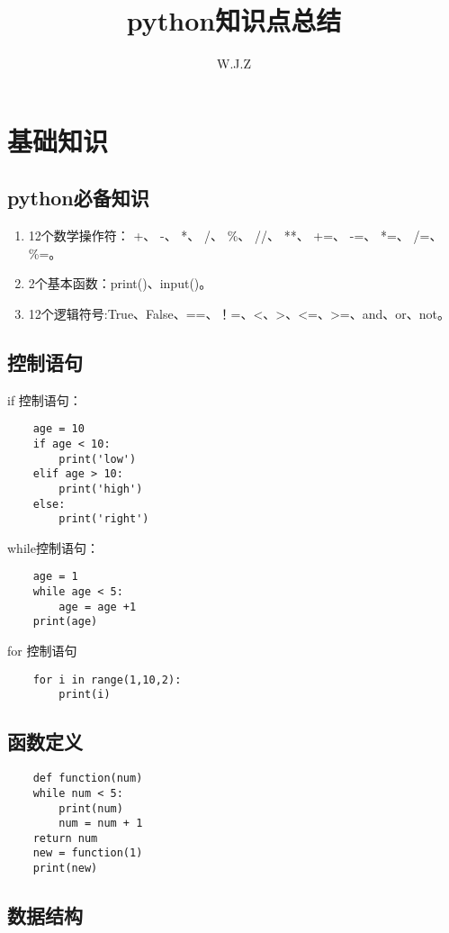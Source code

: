 \documentclass[twocolumn]{article}
\title{python知识点总结}
\author{W.J.Z}
\date{}
\begin{document}
	\maketitle

	
	\section{基础知识}
	\subsection{python必备知识}
	\begin{enumerate}
		\item 12个数学操作符： +、 -、 *、 /、 \%、 \///、 **、 +=、 -=、 *=、 /=、 \%=。 
		
		\item 2个基本函数：print()、input()。
		
		\item 12个逻辑符号:True、False、==、！=、<、>、<=、>=、and、or、not。
	\end{enumerate}

	\subsection{控制语句}
	if 控制语句：

	\begin{lstlisting}
	age = 10
	if age < 10:
		print('low')
	elif age > 10:
		print('high')
	else:
		print('right')
	\end{lstlisting}
	
	while控制语句：
	\begin{lstlisting}
	age = 1
	while age < 5:
		age = age +1
	print(age)
	\end{lstlisting}
	
	for 控制语句
	\begin{lstlisting}
	for i in range(1,10,2):
		print(i)
	\end{lstlisting}
	
	\subsection{函数定义}
	\begin{lstlisting}
	def function(num)
	while num < 5:
		print(num)
		num = num + 1
	return num
	new = function(1)
	print(new)
	\end{lstlisting}
	
	\subsection{数据结构}
\end{document}
